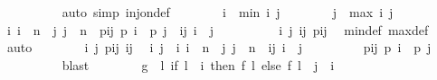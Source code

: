 \begin{isabellebody}
\ \ \ \ \ \ \ \ \isamarkupfalse%
\ {\isacharparenleft}{\kern0pt}auto\ simp{\isacharcolon}{\kern0pt}\ inj{\isacharunderscore}{\kern0pt}on{\isacharunderscore}{\kern0pt}def{\isacharparenright}{\kern0pt}\isanewline
\ \ \ \ \ \ \isamarkupfalse%
\ {\isacharquery}{\kern0pt}i\ {\isacharequal}{\kern0pt}\ {\isachardoublequoteopen}min\ i\ j{\isachardoublequoteclose}\isanewline
\ \ \ \ \ \ \isamarkupfalse%
\ {\isacharquery}{\kern0pt}j\ {\isacharequal}{\kern0pt}\ {\isachardoublequoteopen}max\ i\ j{\isachardoublequoteclose}\isanewline
\ \ \ \ \ \ \isamarkupfalse%
\ i{\isacharcolon}{\kern0pt}\ {\isachardoublequoteopen}{\isacharquery}{\kern0pt}i\ {\isasymle}\ n{\isachardoublequoteclose}\ \ j{\isacharcolon}{\kern0pt}\ {\isachardoublequoteopen}{\isacharquery}{\kern0pt}j\ {\isasymle}\ n{\isachardoublequoteclose}\ \ pij{\isacharcolon}{\kern0pt}\ {\isachardoublequoteopen}{\isacharquery}{\kern0pt}p\ {\isacharquery}{\kern0pt}i\ {\isacharequal}{\kern0pt}\ {\isacharquery}{\kern0pt}p\ {\isacharquery}{\kern0pt}j{\isachardoublequoteclose}\ \ ij{\isacharcolon}{\kern0pt}\ {\isachardoublequoteopen}{\isacharquery}{\kern0pt}i\ {\isacharless}{\kern0pt}\ {\isacharquery}{\kern0pt}j{\isachardoublequoteclose}\isanewline
\ \ \ \ \ \ \ \ \isamarkupfalse%
\ i\ j\ ij\ pij\ \isamarkupfalse%
\ min{\isacharunderscore}{\kern0pt}def\ max{\isacharunderscore}{\kern0pt}def\ \isamarkupfalse%
\ auto\isanewline
\ \ \ \ \ \ \isamarkupfalse%
\ i\ j\ pij\ ij\ \isamarkupfalse%
\ i\ j\ \ i{\isacharcolon}{\kern0pt}\ {\isachardoublequoteopen}i\ {\isasymle}\ n{\isachardoublequoteclose}\ \ j{\isacharcolon}{\kern0pt}\ {\isachardoublequoteopen}j\ {\isasymle}\ n{\isachardoublequoteclose}\ \ ij{\isacharcolon}{\kern0pt}\ {\isachardoublequoteopen}i\ {\isacharless}{\kern0pt}\ j{\isachardoublequoteclose}\isanewline
\ \ \ \ \ \ \ \ \ pij{\isacharcolon}{\kern0pt}\ {\isachardoublequoteopen}{\isacharquery}{\kern0pt}p\ i\ {\isacharequal}{\kern0pt}\ {\isacharquery}{\kern0pt}p\ j{\isachardoublequoteclose}\isanewline
\ \ \ \ \ \ \ \ \isamarkupfalse%
\ blast\isanewline
\ \ \ \ \ \ \isamarkupfalse%
\ {\isacharquery}{\kern0pt}g\ {\isacharequal}{\kern0pt}\ {\isachardoublequoteopen}{\isasymlambda}l{\isachardot}{\kern0pt}\ if\ l\ {\isasymle}\ i\ then\ f\ l\ else\ f\ {\isacharparenleft}{\kern0pt}l\ {\isacharplus}{\kern0pt}\ {\isacharparenleft}{\kern0pt}j\ {\isacharminus}{\kern0pt}\ i{\isacharparenright}{\kern0pt}{\isacharparenright}{\kern0pt}{\isachardoublequoteclose}\isanewline

\end{isabellebody}
